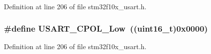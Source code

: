 Definition at line 206 of file stm32f10x\+\_\+usart.\+h.

\subsubsection[{\texorpdfstring{U\+S\+A\+R\+T\+\_\+\+C\+P\+O\+L\+\_\+\+Low}{USART_CPOL_Low}}]{\setlength{\rightskip}{0pt plus 5cm}\#define U\+S\+A\+R\+T\+\_\+\+C\+P\+O\+L\+\_\+\+Low~(({\bf uint16\+\_\+t})0x0000)}\hypertarget{group___u_s_a_r_t___clock___polarity_ga194d60b47d8042d39e843c52f3a6aa1a}{}\label{group___u_s_a_r_t___clock___polarity_ga194d60b47d8042d39e843c52f3a6aa1a}


Definition at line 206 of file stm32f10x\+\_\+usart.\+h.

